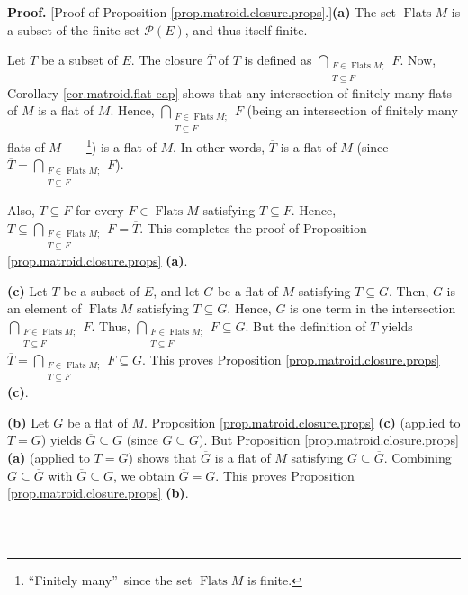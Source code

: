 \documentclass[numbers=enddot,12pt,final,onecolumn,notitlepage]{scrartcl}%
\theoremstyle{definition}
\newenvironment{proof}[1][Proof]{\noindent\textbf{#1.} }{\ \rule{0.5em}{0.5em}}
\let\bigcapnonlimits\bigcap
\renewcommand{\bigcap}{\bigcapnonlimits\limits}
\begin{document}
\begin{proof}
[Proof of Proposition \ref{prop.matroid.closure.props}.]\textbf{(a)} The set
$\operatorname*{Flats}M$ is a subset of the finite set $\mathcal{P}\left(
E\right)  $, and thus itself finite.

Let $T$ be a subset of $E$. The closure $\overline{T}$ of $T$ is defined as
$\bigcap_{\substack{F\in\operatorname*{Flats}M;\\T\subseteq F}}F$. Now,
Corollary \ref{cor.matroid.flat-cap} shows that any intersection of finitely
many flats of $M$ is a flat of $M$. Hence, $\bigcap_{\substack{F\in
\operatorname*{Flats}M;\\T\subseteq F}}F$ (being an intersection of finitely
many flats of $M$\ \ \ \ \footnote{\textquotedblleft Finitely
many\textquotedblright\ since the set $\operatorname*{Flats}M$ is finite.}) is
a flat of $M$. In other words, $\overline{T}$ is a flat of $M$ (since
$\overline{T}=\bigcap_{\substack{F\in\operatorname*{Flats}M;\\T\subseteq F}}F$).

Also, $T\subseteq F$ for every $F\in\operatorname*{Flats}M$ satisfying
$T\subseteq F$. Hence, $T\subseteq\bigcap_{\substack{F\in\operatorname*{Flats}%
M;\\T\subseteq F}}F=\overline{T}$. This completes the proof of Proposition
\ref{prop.matroid.closure.props} \textbf{(a)}.

\textbf{(c)} Let $T$ be a subset of $E$, and let $G$ be a flat of $M$
satisfying $T\subseteq G$. Then, $G$ is an element of $\operatorname*{Flats}M$
satisfying $T\subseteq G$. Hence, $G$ is one term in the intersection
$\bigcap_{\substack{F\in\operatorname*{Flats}M;\\T\subseteq F}}F$. Thus,
$\bigcap_{\substack{F\in\operatorname*{Flats}M;\\T\subseteq F}}F\subseteq G$.
But the definition of $\overline{T}$ yields $\overline{T}=\bigcap
_{\substack{F\in\operatorname*{Flats}M;\\T\subseteq F}}F\subseteq G$. This
proves Proposition \ref{prop.matroid.closure.props} \textbf{(c)}.

\textbf{(b)} Let $G$ be a flat of $M$. Proposition
\ref{prop.matroid.closure.props} \textbf{(c)} (applied to $T=G$) yields
$\overline{G}\subseteq G$ (since $G\subseteq G$). But Proposition
\ref{prop.matroid.closure.props} \textbf{(a)} (applied to $T=G$) shows that
$\overline{G}$ is a flat of $M$ satisfying $G\subseteq\overline{G}$. Combining
$G\subseteq\overline{G}$ with $\overline{G}\subseteq G$, we obtain
$\overline{G}=G$. This proves Proposition \ref{prop.matroid.closure.props}
\textbf{(b)}.


\end{proof}
\end{document}
